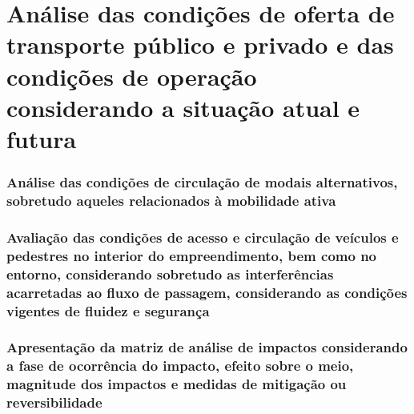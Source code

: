 \documentclass[]{article}
\begin{document}
\hypertarget{anuxe1lise-das-condiuxe7uxf5es-de-oferta-de-transporte-puxfablico-e-privado-e-das-condiuxe7uxf5es-de-operauxe7uxe3o-considerando-a-situauxe7uxe3o-atual-e-futura}{%
\section{Análise das condições de oferta de transporte público e privado
e das condições de operação considerando a situação atual e
futura}\label{anuxe1lise-das-condiuxe7uxf5es-de-oferta-de-transporte-puxfablico-e-privado-e-das-condiuxe7uxf5es-de-operauxe7uxe3o-considerando-a-situauxe7uxe3o-atual-e-futura}}

\hypertarget{anuxe1lise-das-condiuxe7uxf5es-de-circulauxe7uxe3o-de-modais-alternativos-sobretudo-aqueles-relacionados-uxe0-mobilidade-ativa}{%
\subsubsection{Análise das condições de circulação de modais
alternativos, sobretudo aqueles relacionados à mobilidade
ativa}\label{anuxe1lise-das-condiuxe7uxf5es-de-circulauxe7uxe3o-de-modais-alternativos-sobretudo-aqueles-relacionados-uxe0-mobilidade-ativa}}

\hypertarget{avaliauxe7uxe3o-das-condiuxe7uxf5es-de-acesso-e-circulauxe7uxe3o-de-veuxedculos-e-pedestres-no-interior-do-empreendimento-bem-como-no-entorno-considerando-sobretudo-as-interferuxeancias-acarretadas-ao-fluxo-de-passagem-considerando-as-condiuxe7uxf5es-vigentes-de-fluidez-e-seguranuxe7a}{%
\subsubsection{Avaliação das condições de acesso e circulação de
veículos e pedestres no interior do empreendimento, bem como no entorno,
considerando sobretudo as interferências acarretadas ao fluxo de
passagem, considerando as condições vigentes de fluidez e
segurança}\label{avaliauxe7uxe3o-das-condiuxe7uxf5es-de-acesso-e-circulauxe7uxe3o-de-veuxedculos-e-pedestres-no-interior-do-empreendimento-bem-como-no-entorno-considerando-sobretudo-as-interferuxeancias-acarretadas-ao-fluxo-de-passagem-considerando-as-condiuxe7uxf5es-vigentes-de-fluidez-e-seguranuxe7a}}

\hypertarget{apresentauxe7uxe3o-da-matriz-de-anuxe1lise-de-impactos-considerando-a-fase-de-ocorruxeancia-do-impacto-efeito-sobre-o-meio-magnitude-dos-impactos-e-medidas-de-mitigauxe7uxe3o-ou-reversibilidade}{%
\subsubsection{Apresentação da matriz de análise de impactos
considerando a fase de ocorrência do impacto, efeito sobre o meio,
magnitude dos impactos e medidas de mitigação ou
reversibilidade}\label{apresentauxe7uxe3o-da-matriz-de-anuxe1lise-de-impactos-considerando-a-fase-de-ocorruxeancia-do-impacto-efeito-sobre-o-meio-magnitude-dos-impactos-e-medidas-de-mitigauxe7uxe3o-ou-reversibilidade}}
\end{document}
